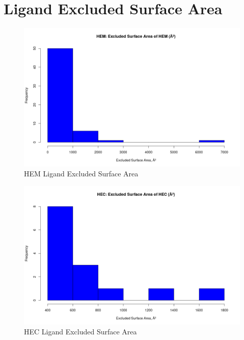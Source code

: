 \section{Ligand Excluded Surface Area}
	\begin{figure}
		\caption{HEM Ligand Excluded Surface Area}
		\label{figs:HEM_ligandExcSA}
		\includegraphics[width=\linewidth]{7A/HEM_ligandExcSA}
	\end{figure}
	
	\begin{figure}
		\caption{HEC Ligand Excluded Surface Area}
		\label{figs:HEC_ligandExcSA}
		\includegraphics[width=\linewidth]{7A/HEC_ligandExcSA}
	\end{figure}

